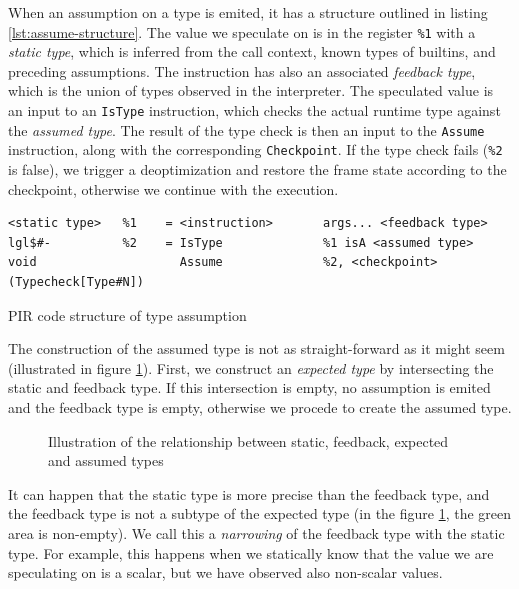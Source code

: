 When an assumption on a type is emited, it has a structure outlined in listing \ref{lst:assume-structure}. The value we speculate on is in the register \texttt{\%1} with a \textit{static type}, which is inferred from the call context, known types of builtins, and preceding assumptions. The instruction has also an associated \textit{feedback type}, which is the union of types observed in the interpreter. The speculated value is an input to an \texttt{IsType} instruction, which checks the actual runtime type against the \textit{assumed type}. The result of the type check is then an input to the \texttt{Assume} instruction, along with the corresponding \texttt{Checkpoint}. If the type check fails (\texttt{\%2} is false), we trigger a deoptimization and restore the frame state according to the checkpoint, otherwise we continue with the execution.

\begin{listing}[H]
	\centering
	\begin{verbatim}
<static type>   %1    = <instruction>       args... <feedback type>
lgl$#-          %2    = IsType              %1 isA <assumed type>
void                    Assume              %2, <checkpoint> (Typecheck[Type#N])
  \end{verbatim}
	\caption{PIR code structure of type assumption}\label{lst:assume-structure}
\end{listing}

The construction of the assumed type is not as straight-forward as it might seem (illustrated in figure \ref{fig:types-venn}). First, we construct an \textit{expected type} by intersecting the static and feedback type. If this intersection is empty, no assumption is emited and the feedback type is empty, otherwise we procede to create the assumed type.

\begin{figure}
	\centering
	\caption{Illustration of the relationship between static, feedback, expected and assumed types}\label{fig:types-venn}
\end{figure}

It can happen that the static type is more precise than the feedback type, and the feedback type is not a subtype of the expected type (in the figure \ref{fig:types-venn}, the green area is non-empty). We call this a \textit{narrowing} of the feedback type with the static type. For example, this happens when we statically know that the value we are speculating on is a scalar, but we have observed also non-scalar values.

